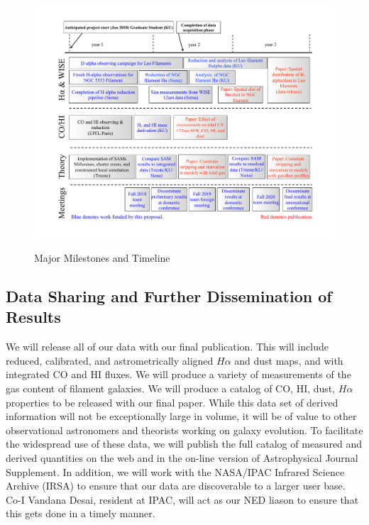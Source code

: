 \documentclass[11pt, preprint]{aastex}
\begin{document}
{\begin{figure}[hb!]
\caption{Major Milestones and Timeline \label{schedule}}
\vspace*{-.4cm}
\includegraphics[width=1.1\textwidth]{work-plan2.pdf}
\label{fig:workplan}
\end{figure}

\vspace*{-.8cm}\subsection{Data Sharing and Further Dissemination of Results }
\vspace*{-.3cm}

We will release all of our data with our final publication.  This will include 
reduced, calibrated, and astrometrically aligned
$H\alpha$ and dust maps, and with integrated CO and HI fluxes.
We will produce a variety of measurements of the gas content of
filament galaxies.  We will produce a catalog of CO, HI, dust, $H\alpha$
properties to be released with our final paper.
While this data set of derived information will not be exceptionally
large in volume, it will be of value to other observational
astronomers and theorists working on galaxy evolution. To facilitate
the widespread use of these data, we will publish the full catalog of
measured and derived quantities on the web and in the on-line version
of Astrophysical Journal Supplement. In addition, we will work with
the NASA/IPAC Infrared Science Archive (IRSA) to ensure that our data are
discoverable to a larger user base. Co-I Vandana Desai, resident at
IPAC, will act as our NED liason to ensure that this gets done in a
timely manner.

}
\end{document}
